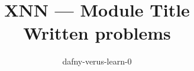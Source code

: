%
\documentclass[11pt]{article}


\title{XNN --- Module Title \\ \large Written problems}
\author{dafny-verus-learn-0}
\date{}


\maketitle

\section*{Instructions}
Answer in \texttt{XNN\_answers.tex}. \texttt{make -C paper paper} must stay
green: a non-compiling answer set is the written track's red build. Run
\texttt{/grade-paper XNN} in a fresh session \emph{before} you formalize
anything and before any lab run; compare with \texttt{paper/solutions/} only as
the module's last step.

